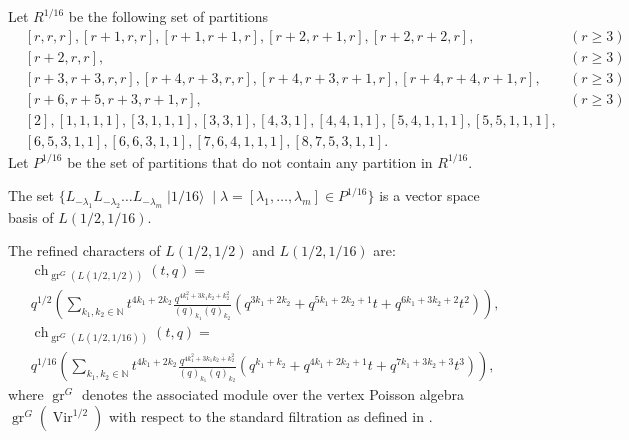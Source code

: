 \documentclass{beamer}
\DeclareMathOperator{\Vir}{Vir}
\DeclareMathOperator{\gr}{gr}
\DeclareMathOperator{\ch}{ch}
\DeclareMathOperator{\vacsixteen}{|1/16\rangle}
\begin{document}
\begin{frame}
  Let $R^{1/16}$ be the following set of partitions
  \footnotesize
  \begin{align*}
    &[r, r, r], [r + 1, r, r], [r + 1, r + 1, r], [r + 2, r + 1, r], [r + 2, r + 2, r], &(r \ge 3) \\
    &[r + 2, r, r], &(r \ge 3) \\
    &[r + 3, r + 3, r, r], [r + 4, r + 3, r, r],  [r + 4, r + 3, r + 1, r], [r + 4, r + 4, r + 1, r], &(r \ge 3)\\
    &[r + 6, r + 5, r + 3, r + 1, r], &(r \ge 3) \\
    &[2], [1, 1, 1, 1], [3, 1, 1, 1], [3, 3, 1], [4, 3, 1], [4, 4, 1, 1], [5, 4, 1, 1, 1], [5, 5, 1, 1, 1], \\
    &[6, 5, 3, 1, 1], [6, 6, 3, 1, 1], [7, 6, 4, 1, 1, 1], [8, 7, 5, 3, 1, 1].
  \end{align*}
  \normalsize
  Let $P^{1/16}$ be the set of partitions that do not contain any partition in $R^{1/16}$.

  \begin{theorem}
    \label{thr:10}
    The set $\{L_{-\lambda_1}L_{-\lambda_2}\dots L_{-\lambda_m}\vacsixteen \mid \lambda = [\lambda_1, \dots, \lambda_m] \in P^{1/16}\}$ is a vector space basis of $L(1/2, 1/16)$.
  \end{theorem}
\end{frame}

\begin{frame}
  \begin{corollary}
    \label{crl:1}
    The refined characters of $L(1/2, 1/2)$ and $L(1/2, 1/16)$ are:
    \footnotesize
    \begin{align*}
      &\ch_{\gr^G(L(1/2, 1/2))}(t, q) = \\
      &q^{1/2}\left(\sum_{k_1, k_2 \in \mathbb{N}}t^{4k_1 + 2k_2}\frac{q^{4k_1^2 + 3k_1k_2 + k_2^2}}{(q)_{k_1}(q)_{k_2}}(q^{3k_1 + 2k_2} + q^{5k_1 + 2k_2 + 1}t + q^{6k_1 + 3k_2 + 2}t^2)\right), \\
      &\ch_{\gr^G(L(1/2, 1/16))}(t, q) = \\
      &q^{1/16}\left(\sum_{k_1, k_2 \in \mathbb{N}}t^{4k_1 + 2k_2}\frac{q^{4k_1^2 + 3k_1k_2 + k_2^2}}{(q)_{k_1}(q)_{k_2}}(q^{k_1 + k_2} + q^{4k_1 + 2k_2 + 1}t + q^{7k_1 + 3k_2 + 3}t^3)\right),
    \end{align*}
    \normalsize
    where $\gr^G$ denotes the associated module over the vertex Poisson algebra $\gr^G(\Vir^{1/2})$ with respect to the standard filtration as defined in \cite{salazar_pbw_2023}.
  \end{corollary}
\end{frame}
\end{document}
